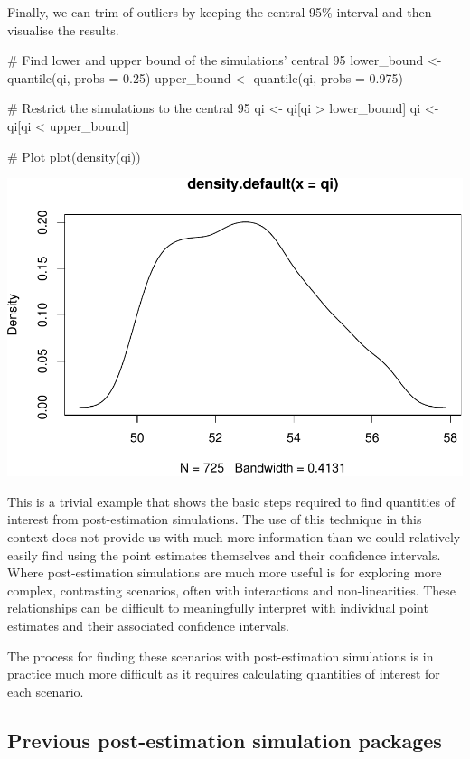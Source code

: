 Finally, we can trim of outliers by keeping the central 95\% interval
and then visualise the results.

\begin{Schunk}
\begin{Sinput}
# Find lower and upper bound of the simulations' central 95%
lower_bound <- quantile(qi, probs = 0.25)
upper_bound <- quantile(qi, probs = 0.975)

# Restrict the simulations to the central 95%
qi <- qi[qi > lower_bound]
qi <- qi[qi < upper_bound]

# Plot
plot(density(qi))
\end{Sinput}

\includegraphics{gandrud_files/figure-latex/unnamed-chunk-3-1} \end{Schunk}

This is a trivial example that shows the basic steps required to find
quantities of interest from post-estimation simulations. The use of this
technique in this context does not provide us with much more information
than we could relatively easily find using the point estimates
themselves and their confidence intervals. Where post-estimation
simulations are much more useful is for exploring more complex,
contrasting scenarios, often with interactions and non-linearities.
These relationships can be difficult to meaningfully interpret with
individual point estimates and their associated confidence intervals.

The process for finding these scenarios with post-estimation simulations
is in practice much more difficult as it requires calculating quantities
of interest for each scenario.

\subsection{Previous post-estimation simulation
packages}\label{previous-post-estimation-simulation-packages}

